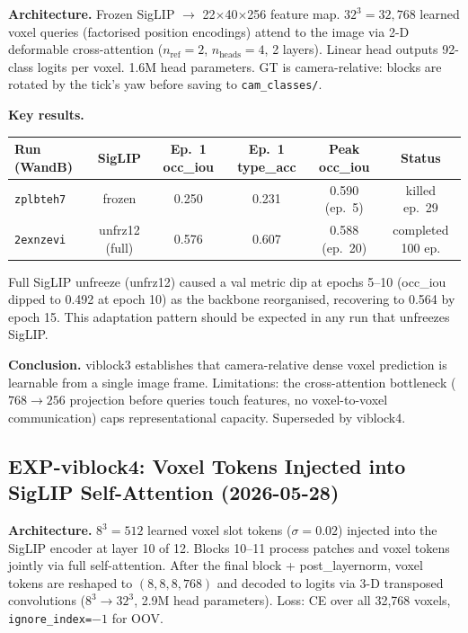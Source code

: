 \documentclass[11pt,a4paper]{article}
\begin{document}
\textbf{Architecture.} Frozen SigLIP $\to$ 22$\times$40$\times$256 feature map. $32^3 = 32{,}768$ learned voxel queries (factorised position encodings) attend to the image via 2-D deformable cross-attention ($n_\text{ref}=2$, $n_\text{heads}=4$, 2 layers). Linear head outputs 92-class logits per voxel. 1.6M head parameters. GT is camera-relative: blocks are rotated by the tick's yaw before saving to \texttt{cam\_classes/}.

\textbf{Key results.}

\begin{center}
\begin{tabular}{lccccc}
\toprule
Run (WandB) & SigLIP & Ep.\ 1 occ\_iou & Ep.\ 1 type\_acc & Peak occ\_iou & Status \\
\midrule
\texttt{zplbteh7} & frozen & 0.250 & 0.231 & 0.590 (ep.\ 5) & killed ep.\ 29 \\
\texttt{2exnzevi} & unfrz12 (full) & 0.576 & 0.607 & 0.588 (ep.\ 20) & completed 100 ep. \\
\bottomrule
\end{tabular}
\end{center}

Full SigLIP unfreeze (unfrz12) caused a val metric dip at epochs 5--10 (occ\_iou dipped to 0.492 at epoch 10) as the backbone reorganised, recovering to 0.564 by epoch 15. This adaptation pattern should be expected in any run that unfreezes SigLIP.

\textbf{Conclusion.} viblock3 establishes that camera-relative dense voxel prediction is learnable from a single image frame. Limitations: the cross-attention bottleneck ($768\to256$ projection before queries touch features, no voxel-to-voxel communication) caps representational capacity. Superseded by viblock4.

\subsection{EXP-viblock4: Voxel Tokens Injected into SigLIP Self-Attention (2026-05-28)}

\textbf{Architecture.} $8^3=512$ learned voxel slot tokens ($\sigma=0.02$) injected into the SigLIP encoder at layer 10 of 12. Blocks 10--11 process patches and voxel tokens jointly via full self-attention. After the final block + post\_layernorm, voxel tokens are reshaped to $(8,8,8,768)$ and decoded to logits via 3-D transposed convolutions ($8^3 \to 32^3$, 2.9M head parameters). Loss: CE over all 32,768 voxels, \texttt{ignore\_index=$-1$} for OOV.
\end{document}
